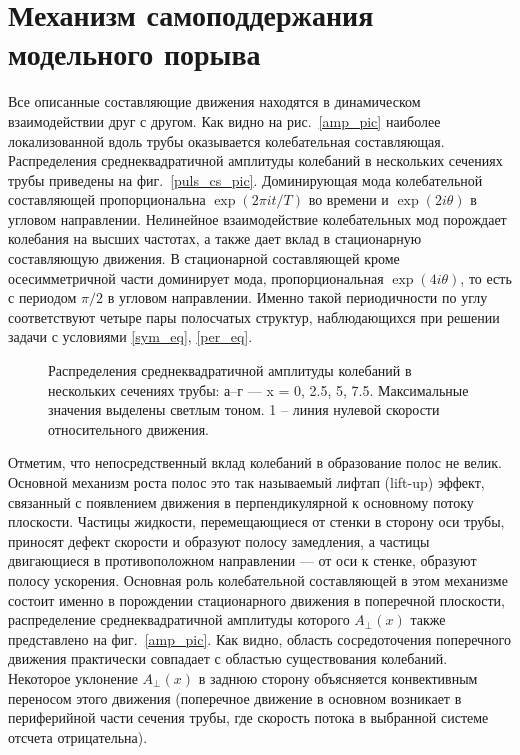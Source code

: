 \section{Механизм самоподдержания модельного порыва} 

Все описанные составляющие движения находятся в динамическом взаимодействии друг с другом. Как видно на рис.~\ref{amp_pic} наиболее локализованной вдоль трубы оказывается колебательная составляющая. Распределения среднеквадратичной амплитуды колебаний в нескольких сечениях трубы приведены на фиг.~\ref{puls_cs_pic}. Доминирующая мода колебательной составляющей пропорциональна $\exp(2\pi it/T)$ во времени и $\exp(2i\theta)$ в угловом направлении. Нелинейное взаимодействие колебательных мод порождает колебания на высших частотах, а также дает вклад в стационарную составляющую движения. В стационарной составляющей кроме осесимметричной части доминирует мода, пропорциональная $\exp(4i\theta)$, то есть с периодом $\pi/2$ в угловом направлении. Именно такой периодичности по углу соответствуют четыре пары полосчатых структур, наблюдающихся при решении задачи с условиями \eqref{sym_eq}, \eqref{per_eq}.

\begin{figure}[h]
\caption{Распределения среднеквадратичной амплитуды колебаний в нескольких сечениях трубы: а--г --- x = 0, 2.5, 5, 7.5. Максимальные значения выделены светлым
тоном. 1 – линия нулевой скорости относительного движения.}
\label{puls_ls_pic}
\end{figure}

Отметим, что непосредственный вклад колебаний в образование полос не велик. Основной механизм роста полос это так называемый лифтап (lift-up) эффект, связанный с появлением движения в перпендикулярной к основному потоку плоскости. Частицы жидкости, перемещающиеся от стенки в сторону оси трубы, приносят дефект скорости и образуют полосу замедления, а частицы двигающиеся в противоположном направлении --- от оси к стенке, образуют полосу ускорения. Основная роль колебательной составляющей в этом механизме состоит именно в порождении стационарного движения в поперечной плоскости, распределение среднеквадратичной амплитуды которого $A_\bot(x)$ также представлено на фиг.~\ref{amp_pic}. Как видно, область сосредоточения поперечного движения практически совпадает с областью существования колебаний. Некоторое уклонение $A_\bot(x)$ в заднюю сторону объясняется конвективным переносом этого движения (поперечное движение в основном возникает в периферийной части сечения трубы, где скорость потока в выбранной системе отсчета отрицательна).


